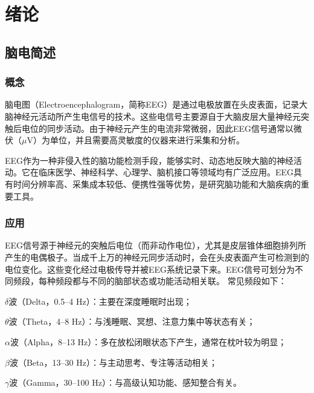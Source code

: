 \documentclass{ctexart}
\begin{document}
	\tableofcontents{}
	\newpage
	\section{绪论}
		\subsection{脑电简述}
			\subsubsection{概念}
				脑电图（Electroencephalogram，简称EEG）是通过电极放置在头皮表面，记录大脑神经元活动所产生电信号的技术。\cite{基于SSVEP脑电智能轮椅的研究与试验}这些电信号主要源自于大脑皮层大量神经元突触后电位的同步活动。由于神经元产生的电流非常微弱，因此EEG信号通常以微伏（$\mu$V）为单位，并且需要高灵敏度的仪器来进行采集和分析。\cite{国内外脑电分析处理软件现状分析及发展趋势}\par
				EEG作为一种非侵入性的脑功能检测手段，能够实时、动态地反映大脑的神经活动。它在临床医学、神经科学、心理学、脑机接口等领域均有广泛应用。EEG具有时间分辨率高、采集成本较低、便携性强等优势，是研究脑功能和大脑疾病的重要工具。
			\subsubsection{应用}\label{sub:应用}
				EEG信号源于神经元的突触后电位（而非动作电位），尤其是皮层锥体细胞排列所产生的电偶极子。当成千上万的神经元同步活动时，会在头皮表面产生可检测到的电位变化。这些变化经过电极传导并被EEG系统记录下来。EEG信号可划分为不同频段，每种频段都与不同的脑部状态或功能活动相关联。
				常见频段如下：\cite{EEG波形伪迹去除方法}\par
				\begin{compactitem}
					\item $\delta$波（Delta，0.5–4 Hz）：主要在深度睡眠时出现；
					\item $\theta$波（Theta，4–8 Hz）：与浅睡眠、冥想、注意力集中等状态有关；
					\item $\alpha$波（Alpha，8–13 Hz）：多在放松闭眼状态下产生，通常在枕叶较为明显；
					\item $\beta$波（Beta，13–30 Hz）：与主动思考、专注等活动相关；
					\item $\gamma$波（Gamma，30–100 Hz）：与高级认知功能、感知整合有关。
				\end{compactitem}
\end{document}
